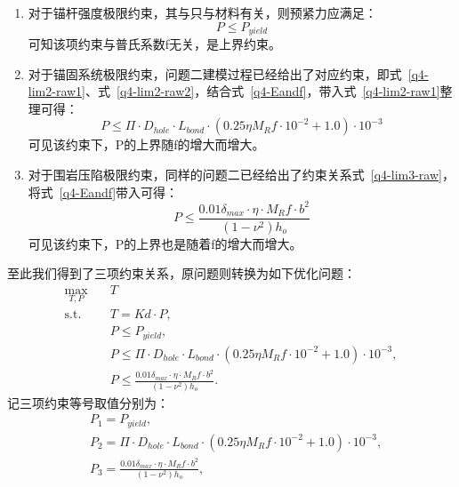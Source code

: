 \documentclass[UTF-8,a4paper,zihao=-4]{ctexart}
\begin{document}
\begin{enumerate}
    \item 对于锚杆强度极限约束，其与只与材料有关，则预紧力应满足：
    \begin{equation}
        P\le P_{yield}
    \label{q4-lim1-raw}
    \end{equation}
    可知该项约束与普氏系数f无关，是上界约束。

    \item 对于锚固系统极限约束，问题二建模过程已经给出了对应约束，即式~\ref{q4-lim2-raw1}、式~\ref{q4-lim2-raw2}，结合式~\ref{q4-Eandf}，带入式~\ref{q4-lim2-raw1}整理可得：
    \begin{equation}
        P\le \Pi\cdot D_{hole}\cdot L_{bond}\cdot (0.25\eta M_Rf\cdot 10^{-2}+1.0)\cdot 10^{-3}
    \label{q4-lim2}
    \end{equation}
    可见该约束下，P的上界随f的增大而增大。

    \item 对于围岩压陷极限约束，同样的问题二已经给出了约束关系式~\ref{q4-lim3-raw}，将式~\ref{q4-Eandf}带入可得：
    \begin{equation}
        P\le \frac{0.01\delta_{max}\cdot \eta\cdot M_Rf\cdot b^2}{(1-\nu^2)h_o}
    \label{q4-lim3}
    \end{equation}
    可见该约束下，P的上界也是随着f的增大而增大。
    
\end{enumerate}
至此我们得到了三项约束关系，原问题则转换为如下优化问题：
\begin{equation}
\begin{aligned}
    \max_{T,P}\quad & T \\[1mm]
    \mathrm{s.t.}\quad
    & T=Kd\cdot P ,\\
    & P\le P_{yield},\\
    & P\le \Pi\cdot D_{hole}\cdot L_{bond}\cdot (0.25\eta M_Rf\cdot 10^{-2}+1.0)\cdot 10^{-3},\\
    & P\le \frac{0.01\delta_{max}\cdot \eta\cdot M_Rf\cdot b^2}{(1-\nu^2)h_o}.
\end{aligned}
\end{equation}
记三项约束等号取值分别为：
\begin{equation*}
\begin{aligned}
    & P_1=P_{yield},\\
    & P_2=\Pi\cdot D_{hole}\cdot L_{bond}\cdot (0.25\eta M_Rf\cdot 10^{-2}+1.0)\cdot 10^{-3},\\
    & P_3=\frac{0.01\delta_{max}\cdot \eta\cdot M_Rf\cdot b^2}{(1-\nu^2)h_o},\\
\end{aligned}
\end{equation*}
\end{document}
